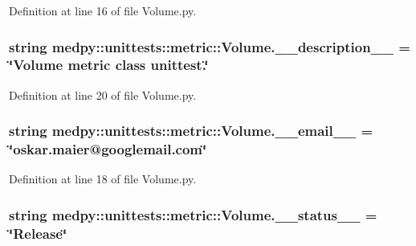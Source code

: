 Definition at line 16 of file Volume.py.

\hypertarget{namespacemedpy_1_1unittests_1_1metric_1_1Volume_a417c0b3e0198bf398c42b5ca0cde7bb1}{
\subsubsection[{\_\-\_\-description\_\-\_\-}]{\setlength{\rightskip}{0pt plus 5cm}string {\bf medpy::unittests::metric::Volume.\_\-\_\-description\_\-\_\-} = \char`\"{}Volume metric class unittest.\char`\"{}}}
\label{namespacemedpy_1_1unittests_1_1metric_1_1Volume_a417c0b3e0198bf398c42b5ca0cde7bb1}


Definition at line 20 of file Volume.py.

\hypertarget{namespacemedpy_1_1unittests_1_1metric_1_1Volume_ac7806f4f1a65b4e3cbb11b20406b42c0}{
\subsubsection[{\_\-\_\-email\_\-\_\-}]{\setlength{\rightskip}{0pt plus 5cm}string {\bf medpy::unittests::metric::Volume.\_\-\_\-email\_\-\_\-} = \char`\"{}oskar.maier@googlemail.com\char`\"{}}}
\label{namespacemedpy_1_1unittests_1_1metric_1_1Volume_ac7806f4f1a65b4e3cbb11b20406b42c0}


Definition at line 18 of file Volume.py.

\hypertarget{namespacemedpy_1_1unittests_1_1metric_1_1Volume_a414da00473eaf2259adffe26e62b066b}{
\subsubsection[{\_\-\_\-status\_\-\_\-}]{\setlength{\rightskip}{0pt plus 5cm}string {\bf medpy::unittests::metric::Volume.\_\-\_\-status\_\-\_\-} = \char`\"{}Release\char`\"{}}}
\label{namespacemedpy_1_1unittests_1_1metric_1_1Volume_a414da00473eaf2259adffe26e62b066b}



